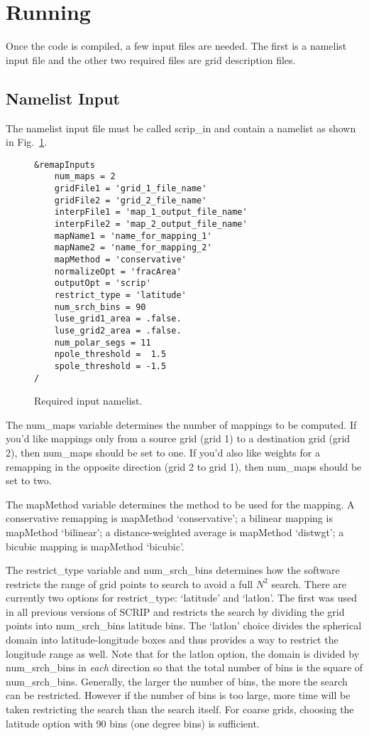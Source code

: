 \documentclass[12pt]{report}
\begin{document}
\section{Running}

Once the code is compiled, a few input files are needed.
The first is a namelist input file and the other two
required files are grid description files.

\subsection{Namelist Input}

The namelist input file must be called scrip\_in
and contain a namelist as shown in Fig.~\ref{fig:nml}.

\begin{figure}
\caption{Required input namelist. \label{fig:nml}}
\begin{verbatim}
&remapInputs
    num_maps = 2
    gridFile1 = 'grid_1_file_name'
    gridFile2 = 'grid_2_file_name'
    interpFile1 = 'map_1_output_file_name'
    interpFile2 = 'map_2_output_file_name'
    mapName1 = 'name_for_mapping_1'
    mapName2 = 'name_for_mapping_2'
    mapMethod = 'conservative'
    normalizeOpt = 'fracArea'
    outputOpt = 'scrip'
    restrict_type = 'latitude'
    num_srch_bins = 90
    luse_grid1_area = .false.
    luse_grid2_area = .false.
    num_polar_segs = 11
    npole_threshold =  1.5
    spole_threshold = -1.5
/
\end{verbatim}
\end{figure}

The num\_maps variable determines the number of mappings
to be computed.  If you'd like mappings only from a source
grid (grid 1) to a destination grid (grid 2), then
num\_maps should be set to one.  If you'd also like weights
for a remapping in the opposite direction (grid 2 to grid 1),
then num\_maps should be set to two.

The mapMethod variable determines the method to be used
for the mapping.  A conservative remapping is mapMethod
`conservative'; a bilinear mapping is mapMethod `bilinear';
a distance-weighted average is mapMethod `distwgt'; a
bicubic mapping is mapMethod `bicubic'.

The restrict\_type variable and num\_srch\_bins determines
how the software restricts the range of grid points to search
to avoid a full $N^2$ search.  There are currently two options
for restrict\_type: `latitude' and `latlon'.  The first was used in
all previous versions of SCRIP and restricts the search by
dividing the grid points into num\_srch\_bins latitude bins.
The `latlon' choice divides the spherical domain into
latitude-longitude boxes and thus provides a way to
restrict the longitude range as well.  Note that for the latlon
option, the domain is divided by num\_srch\_bins in
{\em each} direction so that the total number of bins is the
square of num\_srch\_bins.  Generally, the larger the number
of bins, the more the search can be restricted.  However if
the number of bins is too large, more time will be taken
restricting the search than the search itself.  For coarse
grids, choosing the latitude option with 90 bins (one degree
bins) is sufficient.
\end{document}
